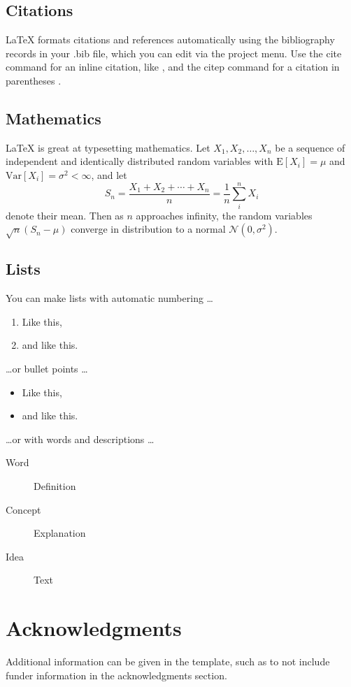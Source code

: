 \documentclass[fleqn,10pt]{olplainarticle}\usepackage[]{graphicx}\usepackage[]{color}
\begin{document}
\subsection{Citations}

LaTeX formats citations and references automatically using the bibliography records in your .bib file, which you can edit via the project menu. Use the cite command for an inline citation, like \cite{lees2010theoretical}, and the citep command for a citation in parentheses \citep{lees2010theoretical}.

\subsection{Mathematics}

\LaTeX{} is great at typesetting mathematics. Let $X_1, X_2, \ldots, X_n$ be a sequence of independent and identically distributed random variables with $\text{E}[X_i] = \mu$ and $\text{Var}[X_i] = \sigma^2 < \infty$, and let
$$S_n = \frac{X_1 + X_2 + \cdots + X_n}{n}
      = \frac{1}{n}\sum_{i}^{n} X_i$$
denote their mean. Then as $n$ approaches infinity, the random variables $\sqrt{n}(S_n - \mu)$ converge in distribution to a normal $\mathcal{N}(0, \sigma^2)$.

\subsection{Lists}

You can make lists with automatic numbering \dots

\begin{enumerate}[noitemsep] 
\item Like this,
\item and like this.
\end{enumerate}
\dots or bullet points \dots
\begin{itemize}[noitemsep] 
\item Like this,
\item and like this.
\end{itemize}
\dots or with words and descriptions \dots
\begin{description}
\item[Word] Definition
\item[Concept] Explanation
\item[Idea] Text
\end{description}

\section*{Acknowledgments}

Additional information can be given in the template, such as to not include funder information in the acknowledgments section.


\end{document}

